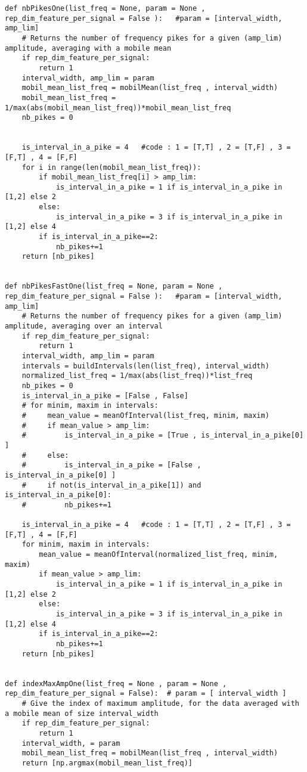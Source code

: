 \documentclass{article}
\begin{document}
\begin{lstlisting}
def nbPikesOne(list_freq = None, param = None , rep_dim_feature_per_signal = False ):   #param = [interval_width, amp_lim]
    # Returns the number of frequency pikes for a given (amp_lim) amplitude, averaging with a mobile mean
    if rep_dim_feature_per_signal:
        return 1
    interval_width, amp_lim = param
    mobil_mean_list_freq = mobilMean(list_freq , interval_width)
    mobil_mean_list_freq = 1/max(abs(mobil_mean_list_freq))*mobil_mean_list_freq
    nb_pikes = 0
    
    
    is_interval_in_a_pike = 4   #code : 1 = [T,T] , 2 = [T,F] , 3 = [F,T] , 4 = [F,F]
    for i in range(len(mobil_mean_list_freq)):
        if mobil_mean_list_freq[i] > amp_lim:
            is_interval_in_a_pike = 1 if is_interval_in_a_pike in [1,2] else 2
        else:
            is_interval_in_a_pike = 3 if is_interval_in_a_pike in [1,2] else 4
        if is_interval_in_a_pike==2:
            nb_pikes+=1
    return [nb_pikes]


def nbPikesFastOne(list_freq = None, param = None , rep_dim_feature_per_signal = False ):   #param = [interval_width, amp_lim]
    # Returns the number of frequency pikes for a given (amp_lim) amplitude, averaging over an interval
    if rep_dim_feature_per_signal:
        return 1
    interval_width, amp_lim = param
    intervals = buildIntervals(len(list_freq), interval_width)
    normalized_list_freq = 1/max(abs(list_freq))*list_freq
    nb_pikes = 0
    is_interval_in_a_pike = [False , False]
    # for minim, maxim in intervals:
    #     mean_value = meanOfInterval(list_freq, minim, maxim)
    #     if mean_value > amp_lim:
    #         is_interval_in_a_pike = [True , is_interval_in_a_pike[0] ]
    #     else:
    #         is_interval_in_a_pike = [False , is_interval_in_a_pike[0] ]
    #     if not(is_interval_in_a_pike[1]) and is_interval_in_a_pike[0]:
    #         nb_pikes+=1
    
    is_interval_in_a_pike = 4   #code : 1 = [T,T] , 2 = [T,F] , 3 = [F,T] , 4 = [F,F]
    for minim, maxim in intervals:
        mean_value = meanOfInterval(normalized_list_freq, minim, maxim)
        if mean_value > amp_lim:
            is_interval_in_a_pike = 1 if is_interval_in_a_pike in [1,2] else 2
        else:
            is_interval_in_a_pike = 3 if is_interval_in_a_pike in [1,2] else 4
        if is_interval_in_a_pike==2:
            nb_pikes+=1
    return [nb_pikes]


def indexMaxAmpOne(list_freq = None , param = None , rep_dim_feature_per_signal = False):  # param = [ interval_width ]
    # Give the index of maximum amplitude, for the data averaged with a mobile mean of size interval_width
    if rep_dim_feature_per_signal:
        return 1
    interval_width, = param
    mobil_mean_list_freq = mobilMean(list_freq , interval_width)
    return [np.argmax(mobil_mean_list_freq)]


\end{lstlisting}
\end{document}
